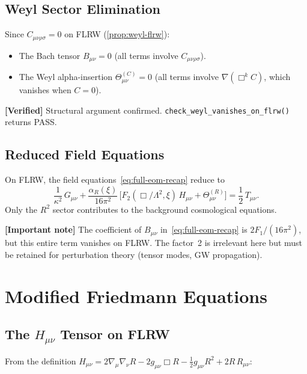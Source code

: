 \documentclass[11pt,a4paper]{article}
\theoremstyle{plain}
\theoremstyle{definition}
\newcommand{\verified}[1]{%
  \par\smallskip\noindent
  \colorbox{green!10}{\parbox{\dimexpr\linewidth-2\fboxsep}{%
    \textcolor{green!50!black}{\textbf{[Verified]}} #1}}%
  \par\smallskip}
\newcommand{\signcorrection}[1]{%
  \par\smallskip\noindent
  \colorbox{red!10}{\parbox{\dimexpr\linewidth-2\fboxsep}{%
    \textcolor{red!60!black}{\textbf{[Important note]}} #1}}%
  \par\smallskip}
\begin{document}
\subsection{Weyl Sector Elimination}

Since $C_{\mu\nu\rho\sigma} = 0$ on FLRW (\cref{prop:weyl-flrw}):
\begin{itemize}[nosep]
  \item The Bach tensor $B_{\mu\nu} = 0$ (all terms involve $C_{\mu\nu\rho\sigma}$).
  \item The Weyl alpha-insertion $\Theta^{(C)}_{\mu\nu} = 0$ (all terms
    involve $\nabla(\Box^k C)$, which vanishes when $C = 0$).
\end{itemize}

\verified{Structural argument confirmed. \texttt{check\_weyl\_vanishes\_on\_flrw()}
returns PASS.}

\subsection{Reduced Field Equations}

On FLRW, the field equations~\eqref{eq:full-eom-recap} reduce to
\begin{equation}\label{eq:reduced-eom}
  \boxed{
  \frac{1}{\kappa^2}\,G_{\mu\nu}
  + \frac{\alpha_R(\xi)}{16\pi^2}\,
  \bigl[F_2(\Box/\Lambda^2,\xi)\,H_{\mu\nu}
    + \Theta^{(R)}_{\mu\nu}\bigr]
  = \frac{1}{2}\,T_{\mu\nu}.
  }
\end{equation}
Only the $R^2$ sector contributes to the background cosmological equations.

\signcorrection{The coefficient of $B_{\mu\nu}$ in~\eqref{eq:full-eom-recap}
is $2F_1/(16\pi^2)$, but this entire term vanishes on FLRW. The factor~2
is irrelevant here but must be retained for perturbation theory
(tensor modes, GW propagation).}

\section{Modified Friedmann Equations}\label{sec:friedmann}

\subsection{The $H_{\mu\nu}$ Tensor on FLRW}

From the definition $H_{\mu\nu} = 2\nabla_\mu\nabla_\nu R
- 2g_{\mu\nu}\Box R - \frac{1}{2}g_{\mu\nu}R^2 + 2R\,R_{\mu\nu}$:
\end{document}
